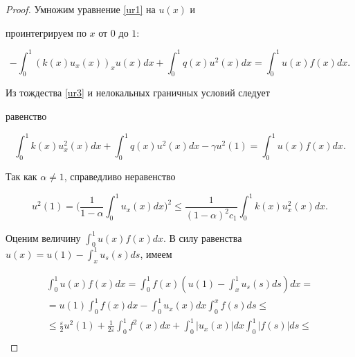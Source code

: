 \smallskip



\begin{proof} Умножим уравнение \eqref{ur1} на $u(x)$ и

проинтегрируем по $x$ от $0$ до $1$:

\begin{equation}

-\int_{0}^{1}(k(x)u_x(x))_xu(x)dx+\int_{0}^{1}q(x)u^2(x)dx=

\int_{0}^{1}u(x)f(x)dx. \label{ur3}

\end{equation}

Из тождества \eqref{ur3} и нелокальных граничных условий следует

равенство

\begin{equation}

\int_{0}^{1}k(x)u_x^2(x)dx

+\int_{0}^{1}q(x)u^2(x)dx-\gamma u^2(1)=

\int_{0}^{1}u(x)f(x)dx. \label{ur4}

\end{equation}



Так как $\alpha\neq1$,  справедливо неравенство

$$

u^2(1)=\biggl(\frac{1}{1-\alpha}\int_{0}^{1}u_x(x)dx\biggr)^2\leq\frac{1}{(1-\alpha)^2c_1}\int_{0}^{1}k(x)u_x^2(x)dx.

$$





Оценим величину $\displaystyle \int_{0}^{1}u(x)f(x)dx$. В силу равенства $ \displaystyle

u(x)=u(1)-\int_{x}^{1}u_s(s)ds$, имеем

\begin{multline*}

\int_{0}^{1}u(x)f(x)dx=\int_{0}^{1}f(x)\left(u(1)-\int_{x}^{1}u_s(s)ds\right)dx=

\\

=u(1)\int_{0}^{1}f(x)dx-\int_{0}^{1}u_x(x)dx\int_{0}^{x}f(s)ds\leq

\\

\leq\frac{\varepsilon}{2}u^2(1)+\frac{1}{2\varepsilon}\int_{0}^{1}f^2(x)dx+\int_{0}^{1}|u_x(x)|dx\int_{0}^{1}|f(s)|ds\leq

\\


\end{multline*}
\end{proof}
